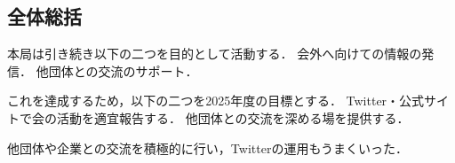 \subsection*{全体総括}


本局は引き続き以下の二つを目的として活動する．
    会外へ向けての情報の発信．
    他団体との交流のサポート．
 
これを達成するため，以下の二つを2025年度の目標とする．
    Twitter・公式サイトで会の活動を適宜報告する．
    他団体との交流を深める場を提供する．

他団体や企業との交流を積極的に行い，Twitterの運用もうまくいった．
